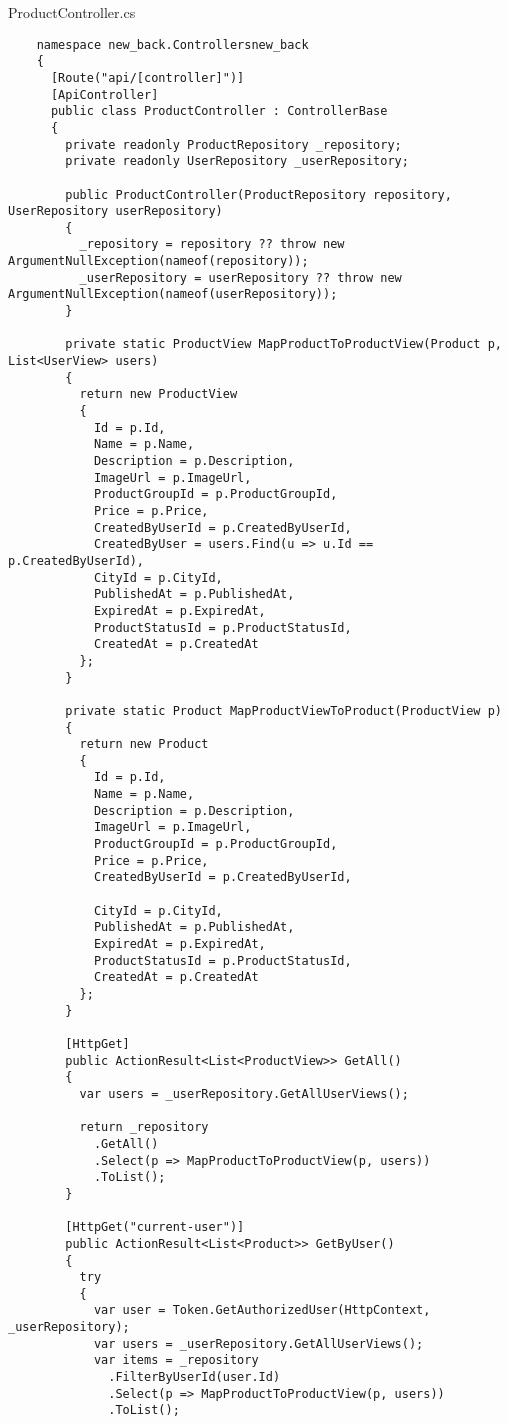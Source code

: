 ProductController.cs
\lstset{style=sharpc}
\begin{lstlisting}
    namespace new_back.Controllersnew_back
    {
      [Route("api/[controller]")]
      [ApiController]
      public class ProductController : ControllerBase
      {
        private readonly ProductRepository _repository;
        private readonly UserRepository _userRepository;
    
        public ProductController(ProductRepository repository, UserRepository userRepository)
        {
          _repository = repository ?? throw new ArgumentNullException(nameof(repository));
          _userRepository = userRepository ?? throw new ArgumentNullException(nameof(userRepository));
        }
    
        private static ProductView MapProductToProductView(Product p, List<UserView> users)
        {
          return new ProductView
          {
            Id = p.Id,
            Name = p.Name,
            Description = p.Description,
            ImageUrl = p.ImageUrl,
            ProductGroupId = p.ProductGroupId,
            Price = p.Price,
            CreatedByUserId = p.CreatedByUserId,
            CreatedByUser = users.Find(u => u.Id == p.CreatedByUserId),
            CityId = p.CityId,
            PublishedAt = p.PublishedAt,
            ExpiredAt = p.ExpiredAt,
            ProductStatusId = p.ProductStatusId,
            CreatedAt = p.CreatedAt
          };
        }
        
        private static Product MapProductViewToProduct(ProductView p)
        {
          return new Product
          {
            Id = p.Id,
            Name = p.Name,
            Description = p.Description,
            ImageUrl = p.ImageUrl,
            ProductGroupId = p.ProductGroupId,
            Price = p.Price,
            CreatedByUserId = p.CreatedByUserId,
            
            CityId = p.CityId,
            PublishedAt = p.PublishedAt,
            ExpiredAt = p.ExpiredAt,
            ProductStatusId = p.ProductStatusId,
            CreatedAt = p.CreatedAt
          };
        }
    
        [HttpGet]
        public ActionResult<List<ProductView>> GetAll()
        {
          var users = _userRepository.GetAllUserViews();
          
          return _repository
            .GetAll()
            .Select(p => MapProductToProductView(p, users))
            .ToList();
        }
        
        [HttpGet("current-user")]
        public ActionResult<List<Product>> GetByUser()
        {
          try
          {
            var user = Token.GetAuthorizedUser(HttpContext, _userRepository);
            var users = _userRepository.GetAllUserViews();
            var items = _repository
              .FilterByUserId(user.Id)
              .Select(p => MapProductToProductView(p, users))
              .ToList();
            

\end{lstlisting}

